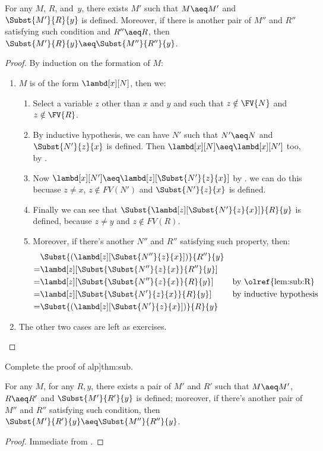 \documentclass[../../../include/open-logic-section]{subfiles}
\begin{document}
\begin{thm}
  For any $M$, $R$, and~$y$, there exists $M'$ such that $M \aeq M'$
  and $\Subst{M'}{R}{y}$ is defined. Moreover, if there is another pair
  of $M''$ and $R''$ satisfying such condition and $R'' \aeq R$, then
  $\Subst{M'}{R}{y} \aeq \Subst{M''}{R''}{y}$.
\end{thm}

\begin{proof}
  By induction on the formation of $M$:
  \begin{enumerate}
  \item $M$ is of the form $\lambd[x][N]$, then we:
    \begin{enumerate}
    \item Select a variable $z$ other than $x$ and $y$ and such that
      $z \notin \FV{N}$ and $z \notin \FV{R}$.
    \item By inductive hypothesis, we can have $N'$ such that $N' \aeq N$
      and $\Subst{N'}{z}{x}$ is defined. Then $\lambd[x][N] \aeq
      \lambd[x][N']$ too, by .
    \item Now $\lambd[x][N'] \aeq \lambd[z][\Subst{N'}{z}{x}]$ by .
      we can do this becuase $z \ne x$, $z \notin FV(N')$ and
      $\Subst{N'}{z}{x}$ is defined.
    \item Finally we can see that
      $\Subst{\lambd[z][\Subst{N'}{z}{x}]}{R}{y}$ is defined,
      because $z \neq y$ and $z \notin FV(R)$.
    \item Moreover, if there's another $N''$ and $R''$ satisfying such
      property, then:
      \begin{align*}
        &\Subst{(\lambd[z][\Subst{N''}{z}{x}])}{R''}{y}\\
        =&\lambd[z][\Subst{\Subst{N''}{z}{x}}{R''}{y}] \\
        =&\lambd[z][\Subst{\Subst{N''}{z}{x}}{R}{y}]
         && \text{by \olref{lem:sub:R}}\\
        =&\lambd[z][\Subst{\Subst{N'}{z}{x}}{R}{y}]
         && \text{by inductive hypothesis}\\
        =&\Subst{(\lambd[z][\Subst{N'}{z}{x}])}{R}{y}
      \end{align*}
    \end{enumerate}
  \item The other two cases are left as
    exercises.
  \end{enumerate}
\end{proof}

\begin{prob}
  Complete the proof of \olref[lam][syn]alp]{thm:sub}.
\end{prob}

\begin{cor}
  For any $M$, for any $R, y$, there exists a pair of $M'$ and $R'$
  such that $M \aeq M'$, $R \aeq R'$ and $\Subst{M'}{R'}{y}$ is
  defined; moreover, if there's another pair of $M''$ and $R''$
  satisfying such condition, then $\Subst{M'}{R'}{y} \aeq
  \Subst{M''}{R''}{y}$.
\end{cor}

\begin{proof}
  Immediate from .
\end{proof}
\end{document}
